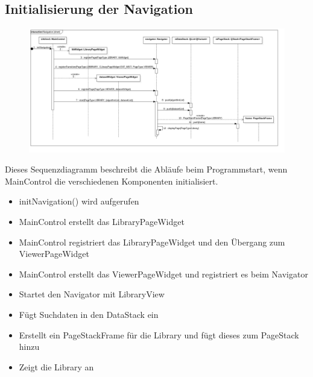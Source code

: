 \subsection{Initialisierung der Navigation}

\begin{figure}[H]
\centering
\includegraphics[width=\linewidth]{img/Sequenzdiagramme/Interaction}
\label{fig:Navigation init}
\end{figure}

Dieses Sequenzdiagramm beschreibt die Abläufe beim Programmstart, wenn MainControl die verschiedenen Komponenten initialisiert.

\begin{itemize}
	\item initNavigation() wird aufgerufen

	\item MainControl erstellt das LibraryPageWidget

	\item MainControl registriert das LibraryPageWidget und den Übergang zum ViewerPageWidget

	\item MainControl erstellt das ViewerPageWidget und registriert es beim Navigator

	\item Startet den Navigator mit LibraryView

	\item Fügt Suchdaten in den DataStack ein

	\item Erstellt ein PageStackFrame für die Library und fügt dieses zum PageStack hinzu

	\item Zeigt die Library an

\end{itemize}

\pagebreak

